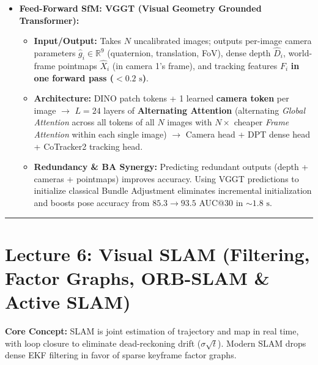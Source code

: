 \documentclass[10pt, a4paper]{article}
\newcommand{\hr}{\vspace{0.8em}\hrule\vspace{0.8em}}
\begin{document}
\begin{itemize}
\begin{itemize}
        \item \textbf{Incremental SfM Loop:} Seed with a wide-baseline two-view reconstruction $\rightarrow$ register next image via \textbf{PnP / P3P} (2D-to-3D matches) $\rightarrow$ triangulate new points $\rightarrow$ run local BA (and periodic global BA) + filter outliers. \textbf{Flaw:} Slow, sequential error accumulation/drift, fails on low overlap or textureless scenes. (GLOMAP is a non-learned global alternative).
    \end{itemize}
    \item \textbf{Feed-Forward SfM: VGGT (Visual Geometry Grounded Transformer):}
    \begin{itemize}
        \item \textbf{Input/Output:} Takes $N$ uncalibrated images; outputs per-image camera parameters $\hat{g}_i \in \mathbb{R}^9$ (quaternion, translation, FoV), dense depth $\hat{D}_i$, world-frame pointmaps $\hat{X}_i$ (in camera 1's frame), and tracking features $F_i$ \textbf{in one forward pass ($<0.2\text{ s}$)}.
        \item \textbf{Architecture:} DINO patch tokens + 1 learned \textbf{camera token} per image $\rightarrow$ $L=24$ layers of \textbf{Alternating Attention} (alternating \emph{Global Attention} across all tokens of all $N$ images with $N\times$ cheaper \emph{Frame Attention} within each single image) $\rightarrow$ Camera head + DPT dense head + CoTracker2 tracking head.
        \item \textbf{Redundancy \& BA Synergy:} Predicting redundant outputs (depth + cameras + pointmaps) improves accuracy. Using VGGT predictions to initialize classical Bundle Adjustment eliminates incremental initialization and boosts pose accuracy from $85.3 \to 93.5$ AUC@30 in $\sim 1.8\text{ s}$.
    \end{itemize}
\end{itemize}

\hr
\section*{\textcolor{primary}{Lecture 6: Visual SLAM (Filtering, Factor Graphs, ORB-SLAM \& Active SLAM)}}
\textbf{Core Concept:} SLAM is joint estimation of trajectory and map in real time, with loop closure to eliminate dead-reckoning drift ($\sigma\sqrt{t}$). Modern SLAM drops dense EKF filtering in favor of sparse keyframe factor graphs.
\end{document}
